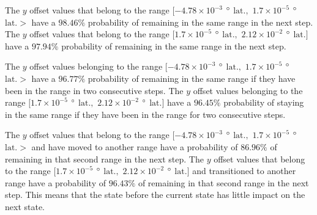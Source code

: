 \documentclass[preprint,12pt]{elsarticle}
\begin{document}
The $y$ offset values that belong to the range $[-4.78 \times 10^{-3}$ $\degree$ $\mathrm{lat.},$ $1.7 \times 10^{-5}$ $\degree$ $\mathrm{lat.}>$ have a $98.46\%$ probability of remaining in the same range in the next step. The $y$ offset values that belong to the range $[1.7 \times 10^{-5}$ $\degree$ $\mathrm{lat.},$ $2.12 \times 10^{-2}$ $\degree$ $\mathrm{lat.}]$ have a $97.94\%$ probability of remaining in the same range in the next step. 

The $y$ offset values belonging to the range $[-4.78 \times 10^{-3}$ $\degree$ $\mathrm{lat.},$ $1.7 \times 10^{-5}$ $\degree$ $\mathrm{lat.}>$ have a $96.77\%$ probability of remaining in the same range if they have been in the range in two consecutive steps. The $y$ offset values belonging to the range $[1.7 \times 10^{-5}$ $\degree$ $\mathrm{lat.},$ $2.12 \times 10^{-2}$ $\degree$ $\mathrm{lat.}]$ have a $96.45\%$ probability of staying in the same range if they have been in the range for two consecutive steps.

The $y$ offset values that belong to the range $[-4.78 \times 10^{-3}$ $\degree$ $\mathrm{lat.},$ $1.7 \times 10^{-5}$ $\degree$ $\mathrm{lat.}>$ and have moved to another range have a probability of $86.96\%$ of remaining in that second range in the next step. The $y$ offset values that belong to the range $[1.7 \times 10^{-5}$ $\degree$ $\mathrm{lat.},$ $ 2.12 \times 10^{-2}$ $\degree$ $\mathrm{lat.}]$ and transitioned to another range have a probability of $96.43\%$ of remaining in that second range in the next step. This means that the state before the current state has little impact on the next state.
\end{document}
